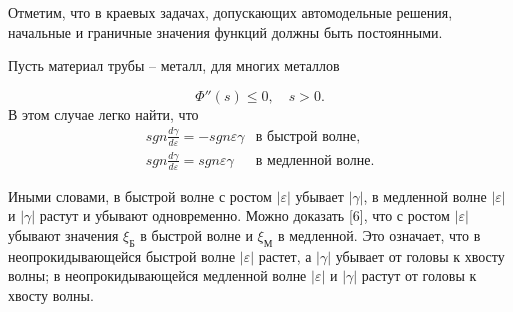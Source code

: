 \documentclass[specialist, subf, href, colorlinks=true, 14pt, final]{disser}
\theoremstyle{definition}
\begin{document}
Отметим, что в краевых задачах, допускающих автомодельные решения, начальные и граничные значения функций должны быть постоянными.

Пусть материал трубы -- металл, для многих металлов
\addtocounter{equation}{1}
\begin{equation}\label{eq:2315}
	 \Phi''(s) \leqslant  0 , \quad s > 0.
	\tag{15}
\end{equation} 
В этом случае легко найти, что
\[
	\begin{array}{lr}
		sgn \displaystyle \frac{d \gamma}{d \varepsilon} = - sgn \varepsilon \gamma & \text{в быстрой волне}, \\
		sgn \displaystyle \frac{d \gamma}{d \varepsilon} = sgn \varepsilon \gamma & \text{в медленной волне}.
	\end{array}
\]

Иными словами, в быстрой волне с ростом $|\varepsilon|$ убывает $|\gamma|$, в медленной волне $|\varepsilon|$ и $|\gamma|$ растут и убывают одновременно. Можно доказать [6], что с ростом $|\varepsilon|$ убывают значения $\xi_{\text{Б}}$ в быстрой волне и $\xi_{\text{М}}$ в медленной. Это означает, что в неопрокидывающейся быстрой волне $|\varepsilon|$ растет, а $|\gamma|$ убывает от головы к хвосту волны; в неопрокидывающейся медленной волне $|\varepsilon|$ и $|\gamma|$ растут от головы к хвосту волны.
\end{document}
